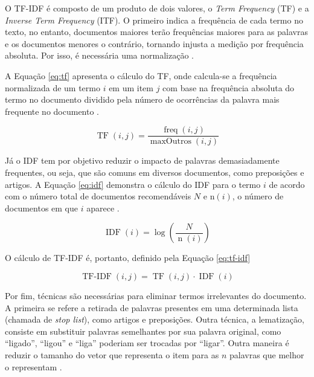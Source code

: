     
    
    O TF-IDF é composto de um produto de dois valores, o \textit{Term Frequency} (TF) e a \textit{Inverse Term Frequency} (ITF). O primeiro indica a frequência de cada termo no texto, no entanto, documentos maiores terão frequências maiores para as palavras e os documentos menores o contrário, tornando injusta a medição por frequência absoluta. Por isso, é necessária uma normalização \cite{Jannach2010}. 
    
    A Equação \ref{eq:tf} apresenta o cálculo do TF, onde calcula-se a frequência normalizada de um termo $i$ em um item $j$ com base na frequência absoluta do termo no documento dividido pela número de ocorrências da palavra mais frequente no documento \cite{Jannach2010}.
     
    \begin{equation}
        \operatorname{TF}(i,j) = \frac{\operatorname{freq}(i,j)}{\operatorname{maxOutros}(i,j)} \label{eq:tf}
    \end{equation}
    
    Já o IDF tem por objetivo reduzir o impacto de palavras demasiadamente frequentes, ou seja, que são comuns em diversos documentos, como preposições e artigos. A Equação \ref{eq:idf} demonstra o cálculo do IDF para o termo $i$ de acordo com o número total de documentos recomendáveis $N$ e $\mathrm{n}(i)$, o número de documentos em que $i$ aparece \cite{Jannach2010}.
    
    \begin{equation}
        \operatorname{IDF}(i) = \log\left(\frac{N}{\operatorname{n}(i)}\right) \label{eq:idf}
    \end{equation}
        
    O cálculo de TF-IDF é, portanto, definido pela Equação \ref{eq:tf-idf}
    
    \begin{equation}
        \operatorname{TF-IDF}(i,j) = \operatorname{TF}(i, j)\cdot \operatorname{IDF}(i) \label{eq:tf-idf}
    \end{equation}

    
    Por fim, técnicas são necessárias para eliminar termos irrelevantes do documento. A primeira se refere a retirada de palavras presentes em uma determinada lista (chamada de \textit{stop list}), como artigos e preposições. Outra técnica, a lematização, consiste em substituir palavras semelhantes por sua palavra original, como ``ligado'', ``ligou'' e ``liga'' poderiam ser trocadas por ``ligar''. Outra maneira é reduzir o tamanho do vetor que representa o item para as $n$ palavras que melhor o representam \cite{Jannach2010}.
    
